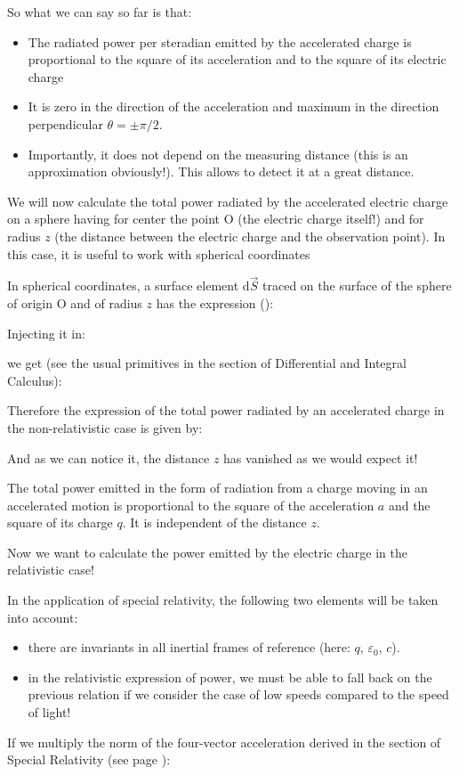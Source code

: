 	So what we can say so far is that:
	\begin{itemize}
		\item The radiated power per steradian emitted by the accelerated charge is proportional to the square of its acceleration and to the square of its electric charge
	
		\item It is zero in the direction of the acceleration and maximum in the direction
	perpendicular $\theta=\pm \pi/2$.
	
		\item Importantly, it does not depend on the measuring distance (this is an approximation obviously!). This allows to detect it at a great distance.
	\end{itemize}
	We will now calculate the total power radiated by the accelerated electric charge on a sphere having for center the point O (the electric charge itself!) and for radius $z$ (the distance between the electric charge and the observation point). In this case, it is useful to work with spherical coordinates
	
	In spherical coordinates, a surface element $\mathrm{d}\vec{S}$ traced on the surface of the sphere of origin O and of radius $z$ has the expression ():
	
	Injecting it in:
	
	we get (see the usual primitives in the section of Differential and Integral Calculus):
	
	Therefore the expression of the total power radiated by an accelerated charge in the non-relativistic case is given by:
	
	And as we can notice it, the distance $z$ has vanished as we would expect it!
	
	The total power emitted in the form of radiation from a charge moving in an accelerated motion is proportional to the square of the acceleration $a$ and the square of its charge $q$. It is independent of the distance $z$.	
	
	Now we want to calculate the power emitted by the electric charge in the relativistic case!
	
	In the application of special relativity, the following two elements will be taken into account:
	\begin{itemize}
		\item there are invariants in all inertial frames of reference (here: $q$, $\varepsilon_0$, $c$).

		\item in the relativistic expression of power, we must be able to fall back on the previous relation  if we consider the case of low speeds compared to the speed of light!
	\end{itemize}
	If we multiply the norm of the four-vector acceleration derived in the section of Special Relativity (see page \pageref{norm of relativistic acceleration}):
	
